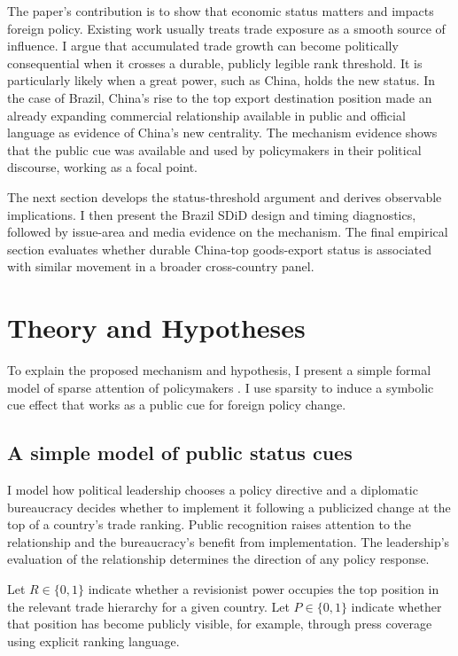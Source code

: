 \documentclass[referee,pdflatex,sn-basic]{sn-jnl}
\theoremstyle{thmstylethree}
\begin{document}
The paper's contribution is to show that economic status matters and impacts foreign policy. Existing work usually treats trade exposure as a smooth source of influence. I argue that accumulated trade growth can become politically consequential when it crosses a durable, publicly legible rank threshold. It is particularly likely when a great power, such as China, holds the new status. In the case of Brazil, China's rise to the top export destination position made an already expanding commercial relationship available in public and official language as evidence of China's new centrality. The mechanism evidence shows that the public cue was available and used by policymakers in their political discourse, working as a focal point.

The next section develops the status-threshold argument and derives observable implications. I then present the Brazil SDiD design and timing diagnostics, followed by issue-area and media evidence on the mechanism. The final empirical section evaluates whether durable China-top goods-export status is associated with similar movement in a broader cross-country panel.

\section{Theory and Hypotheses}\label{theory-and-hypotheses}

To explain the proposed mechanism and hypothesis, I present a simple formal model of sparse attention of policymakers \citep{gabaix2014}. I use sparsity to induce a symbolic cue effect that works as a public cue for foreign policy change.

\subsection{A simple model of public status cues}\label{a-simple-model-of-public-status-cues}

I model how political leadership chooses a policy directive and a diplomatic bureaucracy decides whether to implement it following a publicized change at the top of a country's trade ranking. Public recognition raises attention to the relationship and the bureaucracy's benefit from implementation. The leadership's evaluation of the relationship determines the direction of any policy response.

Let \(R\in\{0,1\}\) indicate whether a revisionist power occupies the top position in the relevant trade hierarchy for a given country. Let \(P\in\{0,1\}\) indicate whether that position has become publicly visible, for example, through press coverage using explicit ranking language.
\end{document}
